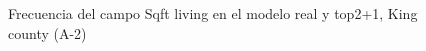 \begin{figure}[H]
    \centering
    
    \caption{Frecuencia del campo Sqft living en el modelo real y top2+1, King county (A-2)}
    \label{frecuency-top2+1-sqft living}
\end{figure}